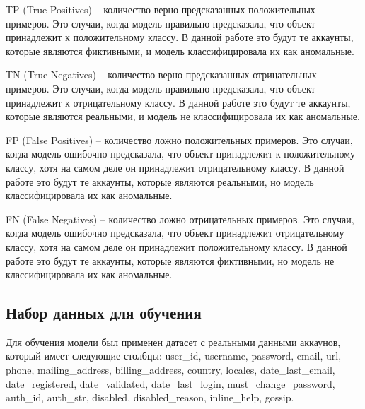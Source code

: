 TP (True Positives) -- количество верно предсказанных положительных примеров. Это случаи, когда модель правильно предсказала, что объект принадлежит к положительному классу. В данной работе это будут те аккаунты, которые являются фиктивными, и модель классифицировала их как аномальные.

TN (True Negatives) -- количество верно предсказанных отрицательных примеров. Это случаи, когда модель правильно предсказала, что объект принадлежит к отрицательному классу. В данной работе это будут те аккаунты, которые являются реальными, и модель не классифицировала их как аномальные.

FP (False Positives) -- количество ложно положительных примеров. Это случаи, когда модель ошибочно предсказала, что объект принадлежит к положительному классу, хотя на самом деле он принадлежит отрицательному классу. В данной работе это будут те аккаунты, которые являются реальными, но модель классифицировала их как аномальные.

FN (False Negatives) -- количество ложно отрицательных примеров. Это случаи, когда модель ошибочно предсказала, что объект принадлежит отрицательному классу, хотя на самом деле он принадлежит положительному классу. В данной работе это будут те аккаунты, которые являются фиктивными, но модель не классифицировала их как аномальные.

\vspace{1.5em}
\subsection{Набор данных для обучения}
\label{subsec:Dataset}

Для обучения модели был применен датасет с реальными данными аккаунов, который имеет следующие столбцы: user\_id, username, password, email, url, phone, mailing\_address, billing\_address, country, locales, date\_last\_email, date\_registered, date\_validated, date\_last\_login, must\_change\_password, auth\_id, auth\_str, disabled, disabled\_reason, inline\_help, gossip. 

